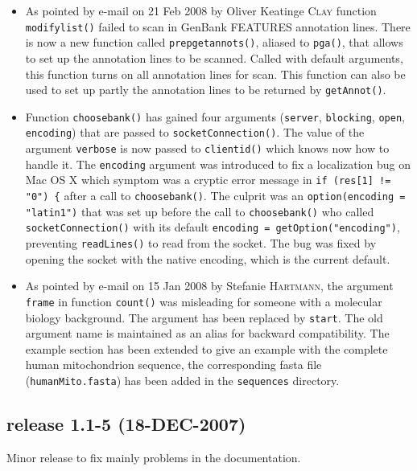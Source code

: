 \documentclass{article}
\begin{document}
\begin{itemize}
\item As pointed by e-mail on 21 Feb 2008 by Oliver Keatinge \textsc{Clay}
  function \texttt{modifylist()} failed to scan in GenBank FEATURES
  annotation lines. There is now a new function called
  \texttt{prepgetannots()}, aliased to \texttt{pga()}, that allows
  to set up the annotation lines to be scanned. Called with default
  arguments, this function turns on all annotation lines for scan.
  This function can also be used to set up partly the annotation lines
  to be returned by \texttt{getAnnot()}.

\item Function \texttt{choosebank()} has gained four arguments
  (\texttt{server}, \texttt{blocking}, \texttt{open}, \texttt{encoding})
  that are passed to \texttt{socketConnection()}. The value of
  the argument \texttt{verbose} is now passed to \texttt{clientid()}
  which knows now how to handle it. The \texttt{encoding} argument
  was introduced to fix a localization bug on Mac OS X which symptom was a
  cryptic error message in \texttt{if (res[1] != "0") \{} after
  a call to \texttt{choosebank()}. The culprit was an
  \texttt{option(encoding = "latin1")} that was set up before
  the call to \texttt{choosebank()} who called \texttt{socketConnection()}
  with its default \texttt{encoding = getOption("encoding")},
  preventing \texttt{readLines()} to read from the socket.
  The bug was fixed by opening the socket with the native encoding,
  which is the current default.

\item As pointed by e-mail on 15 Jan 2008 by Stefanie \textsc{Hartmann}, the
  argument \texttt{frame} in function \texttt{count()} was misleading
  for someone with a molecular biology background. The argument has
  been replaced by \texttt{start}. The old argument name is maintained
  as an alias for backward compatibility. The example section has
  been extended to
  give an example with the complete human mitochondrion sequence, the
  corresponding fasta file (\texttt{humanMito.fasta}) has been added in the
  \texttt{sequences} directory.
\end{itemize}

\subsection*{release 1.1-5 (18-DEC-2007)}

Minor release to fix mainly problems in the documentation.
\end{document}
